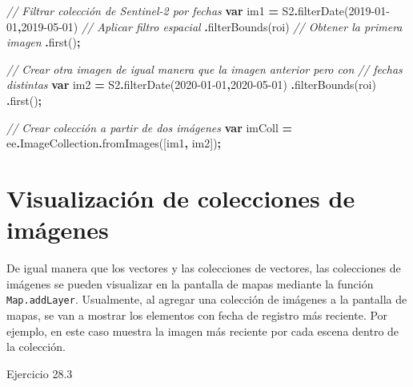 \documentclass[
  12pt,
  letterpaper,
  twoside]{book}
\newenvironment{Shaded}{\begin{snugshade}}{\end{snugshade}}
\newcommand{\AttributeTok}[1]{\textcolor[rgb]{0.77,0.63,0.00}{#1}}
\newcommand{\CommentTok}[1]{\textcolor[rgb]{0.56,0.35,0.01}{\textit{#1}}}
\newcommand{\FunctionTok}[1]{\textcolor[rgb]{0.00,0.00,0.00}{#1}}
\newcommand{\KeywordTok}[1]{\textcolor[rgb]{0.13,0.29,0.53}{\textbf{#1}}}
\newcommand{\NormalTok}[1]{#1}
\newcommand{\OperatorTok}[1]{\textcolor[rgb]{0.81,0.36,0.00}{\textbf{#1}}}
\newcommand{\StringTok}[1]{\textcolor[rgb]{0.31,0.60,0.02}{#1}}
\begin{document}
\begin{Shaded}
\begin{Highlighting}[]
\CommentTok{// Filtrar colección de Sentinel{-}2 por fechas}
\KeywordTok{var}\NormalTok{ im1 }\OperatorTok{=}\NormalTok{ S2}\OperatorTok{.}\FunctionTok{filterDate}\NormalTok{(}\StringTok{\textquotesingle{}2019{-}01{-}01\textquotesingle{}}\OperatorTok{,}\StringTok{\textquotesingle{}2019{-}05{-}01\textquotesingle{}}\NormalTok{)}
  \CommentTok{// Aplicar filtro espacial}
 \OperatorTok{.}\FunctionTok{filterBounds}\NormalTok{(roi)}
 \CommentTok{// Obtener la primera imagen}
 \OperatorTok{.}\FunctionTok{first}\NormalTok{()}\OperatorTok{;}

\CommentTok{// Crear otra imagen de igual manera que la imagen anterior pero con }
\CommentTok{// fechas distintas}
\KeywordTok{var}\NormalTok{ im2 }\OperatorTok{=}\NormalTok{ S2}\OperatorTok{.}\FunctionTok{filterDate}\NormalTok{(}\StringTok{\textquotesingle{}2020{-}01{-}01\textquotesingle{}}\OperatorTok{,}\StringTok{\textquotesingle{}2020{-}05{-}01\textquotesingle{}}\NormalTok{)}
 \OperatorTok{.}\FunctionTok{filterBounds}\NormalTok{(roi)}
 \OperatorTok{.}\FunctionTok{first}\NormalTok{()}\OperatorTok{;}

\CommentTok{// Crear colección a partir de dos imágenes}
\KeywordTok{var}\NormalTok{ imColl }\OperatorTok{=}\NormalTok{ ee}\OperatorTok{.}\AttributeTok{ImageCollection}\OperatorTok{.}\FunctionTok{fromImages}\NormalTok{([im1}\OperatorTok{,}\NormalTok{ im2])}\OperatorTok{;}
\end{Highlighting}
\end{Shaded}

\hypertarget{visualizaciuxf3n-de-colecciones-de-imuxe1genes}{%
\section{Visualización de colecciones de imágenes}\label{visualizaciuxf3n-de-colecciones-de-imuxe1genes}}

De igual manera que los vectores y las colecciones de vectores, las colecciones de imágenes se pueden visualizar en la pantalla de mapas mediante la función \texttt{Map.addLayer}. Usualmente, al agregar una colección de imágenes a la pantalla de mapas, se van a mostrar los elementos con fecha de registro más reciente. Por ejemplo, en este caso muestra la imagen más reciente por cada escena dentro de la colección.

Ejercicio 28.3
\end{document}
